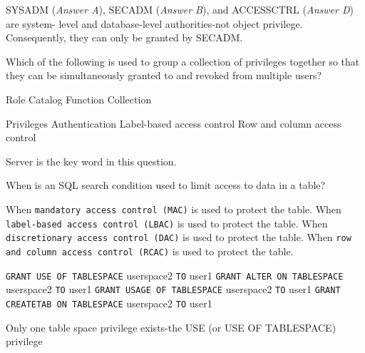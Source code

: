 \documentclass[answers, 11pt]{exam}
\begin{document}
\begin{questions}
\begin{solution}
SYSADM (\textit{Answer A}), SECADM (\textit{Answer B}), and ACCESSCTRL (\textit{Answer D}) are system-
level and database-level authorities-not object privilege. Consequently, they can only be granted by 
SECADM.
\end{solution}

\question[1]
Which of the following is used to group a collection of privileges together so that they can be
simultaneously granted to and revoked from multiple users?
\begin{choices}
\CorrectChoice Role
\choice Catalog
\choice Function
\choice Collection
\end{choices}

\begin{choices}
\choice Privileges
\CorrectChoice Authentication
\choice Label-based access control
\choice Row and column access control
\end{choices}

\begin{solution}
Server is the key word in this question. 
\end{solution}

\question[1]
When is an SQL search condition used to limit access to data in a table?
\begin{choices}
\choice When \texttt{mandatory access control (MAC)} is used to protect the table.
\choice When \texttt{label-based access control (LBAC)} is used to protect the table.
\choice When \texttt{discretionary access control (DAC)} is used to protect the table.
\CorrectChoice When \texttt{row and column access control (RCAC)} is used to protect the table.
\end{choices}

\begin{choices}
\CorrectChoice \texttt{GRANT USE OF TABLESPACE} userspace2 \texttt{TO} user1
\choice \texttt{GRANT ALTER ON TABLESPACE} userspace2 \texttt{TO} user1
\choice \texttt{GRANT USAGE OF TABLESPACE} userspace2 \texttt{TO} user1
\choice \texttt{GRANT CREATETAB ON TABLESPACE} userspace2 \texttt{TO} user1
\end{choices}

\begin{solution}
Only one table space privilege exists-the USE (or USE OF TABLESPACE) privilege
\end{solution}


\end{questions}
\end{document}
